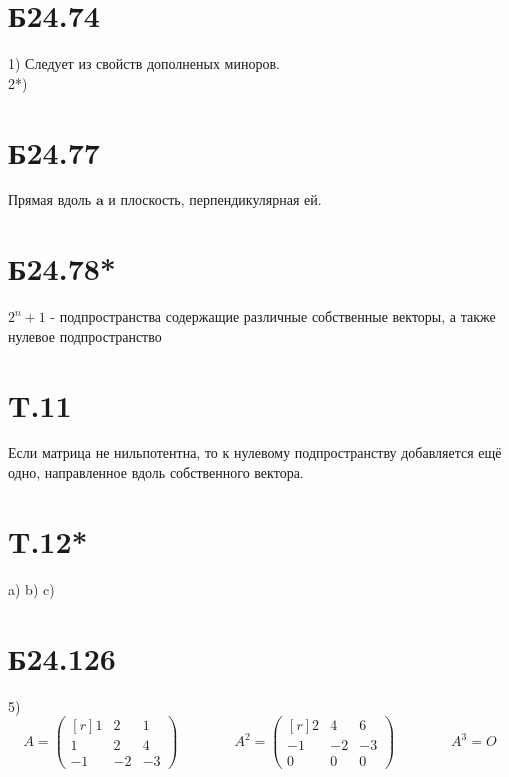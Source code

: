 \documentclass[a4paper,12pt]{article} %
\begin{document}
\section*{Б24.74}
1) Следует из свойств дополненых миноров.\\
2*)
\section*{Б24.77} Прямая вдоль $\textbf{a}$ и плоскость, перпендикулярная ей.
\section*{Б24.78*} $2^{n}+1$ - подпространства содержащие различные собственные векторы, а также нулевое подпространство
\section*{T.11} Если матрица не нильпотентна, то к нулевому подпространству добавляется ещё одно, направленное вдоль собственного вектора.
\section*{T.12*}
a)
b)
c)
\section*{Б24.126}5)$$A=\begin{pmatrix*}[r]
    1&2&1\\
    1&2&4\\
    -1&-2&-3
\end{pmatrix*}\quad\quad\quad\quad A^2=\begin{pmatrix*}[r]
    2&4&6\\
    -1&-2&-3\\
    0&0&0
\end{pmatrix*}\quad\quad\quad\quad A^{3}=O$$
\end{document}
